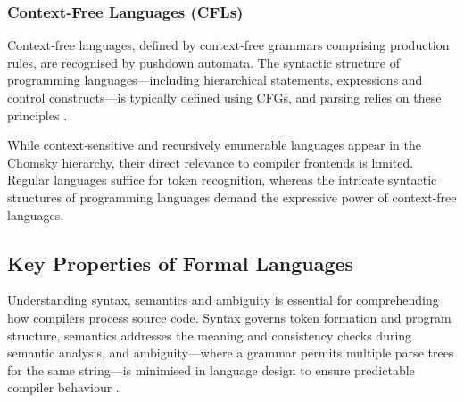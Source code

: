 \subsubsection*{Context‑Free Languages (CFLs)}
Context‑free languages, defined by context‑free grammars comprising production rules, are recognised by pushdown automata. The syntactic structure of programming languages—including hierarchical statements, expressions and control constructs—is typically defined using CFGs, and parsing relies on these principles \cite{kent-context-free-grammars-pda, aho2007compilers}.

While context‑sensitive and recursively enumerable languages appear in the Chomsky hierarchy, their direct relevance to compiler frontends is limited. Regular languages suffice for token recognition, whereas the intricate syntactic structures of programming languages demand the expressive power of context‑free languages.

\subsection{Key Properties of Formal Languages}

Understanding syntax, semantics and ambiguity is essential for comprehending how compilers process source code. Syntax governs token formation and program structure, semantics addresses the meaning and consistency checks during semantic analysis, and ambiguity—where a grammar permits multiple parse trees for the same string—is minimised in language design to ensure predictable compiler behaviour \cite{aho2007compilers}.


